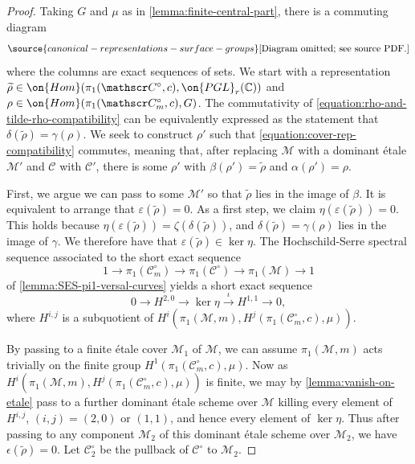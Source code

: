 \begin{proof}
	Taking $G$ and $\mu$ as in \autoref{lemma:finite-central-part},
	there is a commuting diagram
\begin{equation}
	\label{equation:pgl-and-birman}
\source{canonical-representations-surface-groups}
	\text{[Diagram omitted; see source PDF.]}\end{equation}
where the columns are exact sequences of sets.
We start with a representation $\widetilde{\rho} \in \on{Hom}(\pi_1(\mathscr C^\circ,c),
\on{PGL}_r(\mathbb C))$
and $\rho \in \on{Hom}(\pi_1(\mathscr C_m^\circ, c), G)$.
The commutativity of \eqref{equation:rho-and-tilde-rho-compatibility} can be equivalently
expressed as the statement that $\delta(\widetilde{\rho}) = \gamma(\rho)$.
We seek to construct $\rho'$ such that \eqref{equation:cover-rep-compatibility} commutes,
meaning that, after replacing $\mathscr M$ with a dominant \'etale $\mathscr M'$ and $\mathscr{C}$ with $\mathscr{C}'$,
there is some $\rho'$ with $\beta(\rho') = \widetilde{\rho}$ and $\alpha(\rho')
= \rho$.

First, we argue we can pass to some $\mathscr M'$ so that $\widetilde{\rho}$
lies in the image of $\beta$.
It is equivalent to arrange that $\varepsilon(\widetilde{\rho}) = 0$.
As a first step, we claim $\eta(\varepsilon(\widetilde{\rho})) = 0$.
This holds because $\eta(\varepsilon(\widetilde{\rho})) =
\zeta(\delta(\widetilde{\rho}))$, and
$\delta(\widetilde{\rho}) = \gamma(\rho)$ lies in the image of $\gamma$.
We therefore have that $\varepsilon(\widetilde{\rho}) \in \ker \eta$.
The Hochschild-Serre spectral sequence associated to the short exact sequence  $$1\to \pi_1(\mathscr{C}_m^\circ)\to \pi_1(\mathscr{C}^\circ)\to \pi_1(\mathscr{M})\to 1$$ of
\autoref{lemma:SES-pi1-versal-curves} yields a short exact sequence $$0\to H^{2,0}\to \ker \eta \overset{\iota}{\to} H^{1,1}\to 0,$$ where $H^{i,j}$ is a subquotient of $H^i(\pi_1(\mathscr M, m), H^j(\pi_1(\mathscr C^\circ_m,c),
\mu))$.

By passing to a finite \'etale cover $\mathscr{M}_1$ of $\mathscr{M}$, we can assume $\pi_1(\mathscr{M}, m)$ acts trivially on the finite group $H^1(\pi_1(\mathscr{C}_m^\circ, c), \mu)$.  Now as $H^i(\pi_1(\mathscr M, m), H^j(\pi_1(\mathscr C^\circ_m,c),
\mu))$ is finite, we may by \autoref{lemma:vanish-on-etale} pass to a further
dominant \'etale scheme over $\mathscr{M}$ killing every element of $H^{i,j}$,
$(i,j)=(2,0) \text{ or } (1,1)$, and hence every element of $\ker \eta$. Thus
after passing to any component $\mathscr{M}_2$ of this dominant \'etale scheme
over $\mathscr M_2$, we have $\epsilon(\widetilde\rho)=0$. Let $\mathscr{C}_2^\circ$ be the pullback of $\mathscr{C}^\circ$ to $\mathscr{M}_2$.


\end{proof}
